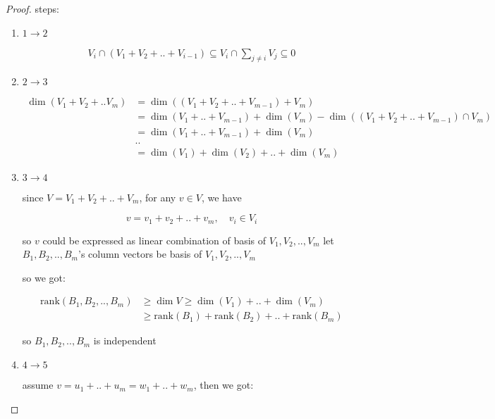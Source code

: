\begin{proof}
    steps:

    \begin{enumerate}
        \item $1 \to 2$

        \begin{align*}
            V_i \cap (V_1 + V_2 + .. + V_{i-1}) \subseteq V_i \cap \sum_{j \ne i}V_j \subseteq 0
        \end{align*}

        \item $2 \to 3$

        \begin{align*}
            \dim(V_1 + V_2 + .. V_m) &= \dim((V_1 + V_2 + .. + V_{m-1}) + V_m) \\
            &=  \dim(V_1 + .. + V_{m-1}) + \dim(V_m) - \dim((V_1 + V_2 + .. + V_{m-1}) \cap V_m)\\
            &= \dim(V_1 + .. + V_{m-1}) + \dim(V_m) \\
            & .. \\
            & = \dim(V_1) + \dim(V_2) + .. + \dim(V_m)
        \end{align*}

        \item $3 \to 4$



        since $V = V_1 + V_2 + .. + V_m$, for any $v \in V$, we have 

        \[
            v = v_1 + v_2 + .. + v_m,\quad v_i \in V_i
        \]

        so $v$ could be expressed as linear combination of basis of $V_1, V_2, ..,V_m$
        let $B_1, B_2, .., B_m$'s column vectors be basis of $V_1, V_2, .., V_m$

        so we got:

        \begin{align*}
            \mathrm{rank}(B_1, B_2, .., B_m) &\ge \dim V \ge \dim(V_1) + .. + \dim(V_m) \\
            & \ge \mathrm{rank}(B_1) + \mathrm{rank}(B_2) + .. + \mathrm{rank}(B_m)
        \end{align*}

        so $B_1, B_2, .., B_m$ is independent


        \item $4 \to 5$

        assume $v = u_1 + .. + u_m = w_1 + .. + w_m$, then we got:


\end{enumerate}
\end{proof}
